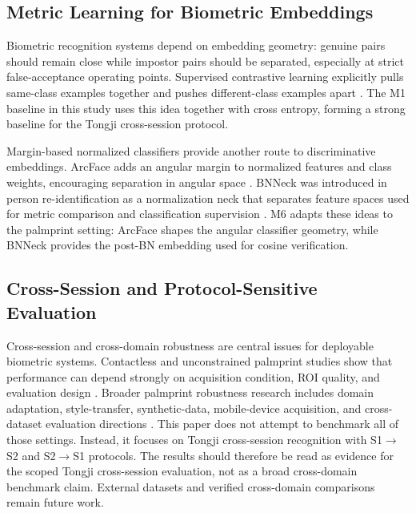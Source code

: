 \subsection{Metric Learning for Biometric Embeddings}

Biometric recognition systems depend on embedding geometry: genuine pairs should remain close while impostor pairs should be separated, especially at strict false-acceptance operating points. Supervised contrastive learning explicitly pulls same-class examples together and pushes different-class examples apart \cite{khosla2020supervised}. The M1 baseline in this study uses this idea together with cross entropy, forming a strong baseline for the Tongji cross-session protocol.

Margin-based normalized classifiers provide another route to discriminative embeddings. ArcFace adds an angular margin to normalized features and class weights, encouraging separation in angular space \cite{deng2019arcface}. BNNeck was introduced in person re-identification as a normalization neck that separates feature spaces used for metric comparison and classification supervision \cite{luo2019strong}. M6 adapts these ideas to the palmprint setting: ArcFace shapes the angular classifier geometry, while BNNeck provides the post-BN embedding used for cosine verification.

\subsection{Cross-Session and Protocol-Sensitive Evaluation}

Cross-session and cross-domain robustness are central issues for deployable biometric systems. Contactless and unconstrained palmprint studies show that performance can depend strongly on acquisition condition, ROI quality, and evaluation design \cite{ungureanu2020toward,matkowski2020uncontrolled}. Broader palmprint robustness research includes domain adaptation, style-transfer, synthetic-data, mobile-device acquisition, and cross-dataset evaluation directions \cite{zhang2020smartphone,shao2020efficient}. This paper does not attempt to benchmark all of those settings. Instead, it focuses on Tongji cross-session recognition with S1$\rightarrow$S2 and S2$\rightarrow$S1 protocols. The results should therefore be read as evidence for the scoped Tongji cross-session evaluation, not as a broad cross-domain benchmark claim. External datasets and verified cross-domain comparisons remain future work.


